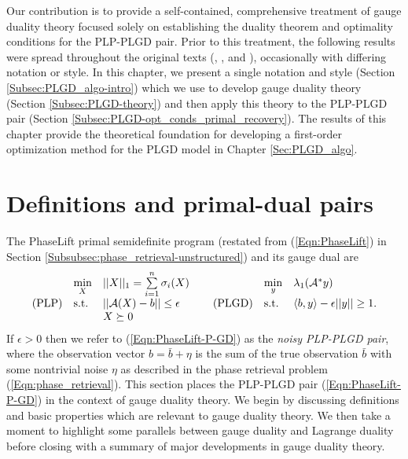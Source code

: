 Our contribution is to provide a self-contained, comprehensive treatment of gauge duality theory focused solely on establishing the duality theorem and optimality conditions for the PLP-PLGD pair.  Prior to this treatment, the following results were spread throughout the original texts (\cite{rockafellar1970convex}, \cite{DBLP:journals/siamjo/FriedlanderMP14}, and \cite{DBLP:journals/siamsc/FriedlanderM16}), occasionally with differing notation or style.  In this chapter, we present a single notation and style (Section \ref{Subsec:PLGD_algo-intro}) which we use to develop gauge duality theory (Section \ref{Subsec:PLGD-theory}) and then apply this theory to the PLP-PLGD pair (Section \ref{Subsec:PLGD-opt_conds_primal_recovery}).  The results of this chapter provide the theoretical foundation for developing a first-order optimization method for the PLGD model in Chapter \ref{Sec:PLGD_algo}.


\section{Definitions and primal-dual pairs}		\label{Subsec:PLGD-models_intro}



The PhaseLift primal semidefinite program (restated from (\ref{Eqn:PhaseLift}) in Section \ref{Subsubsec:phase_retrieval-unstructured}) and its gauge dual are
\begin{equation} \label{Eqn:PhaseLift-P-GD}
\begin{array}{lllllll}
	&	\min\limits_{\substack{X}}
		&	||X||_1 = \sum\limits_{\substack{i=1}}^{\substack{n}} \sigma_i(X)
			&
				&	\min\limits_{\substack{y}}
					&	\lambda_1({\mathcal A}^* y)
						\\
\textnormal{(PLP)}
	&	\textnormal{s.t.}
		& 	|| {\mathcal A} (X) - b || \leq \epsilon
			&	\hspace{0.4cm} 	\textnormal{(PLGD)}
				&	\textnormal{s.t.}
					&	\langle b, y \rangle - \epsilon ||y|| \geq 1.
						\\

	&
		&	X \succeq 0

\end{array}
\end{equation}
If $\epsilon > 0$ then we refer to (\ref{Eqn:PhaseLift-P-GD}) as the \textit{noisy PLP-PLGD pair}, where the observation vector $b = \bar{b} + \eta$ is the sum of the true observation $\bar{b}$ with some nontrivial noise $\eta$ as described in the phase retrieval problem (\ref{Eqn:phase_retrieval}).  This section places the PLP-PLGD pair (\ref{Eqn:PhaseLift-P-GD}) in the context of gauge duality theory.  We begin by discussing definitions and basic properties which are relevant to gauge duality theory.  We then take a moment to highlight some parallels between gauge duality and Lagrange duality before closing with a summary of major developments in gauge duality theory.  

